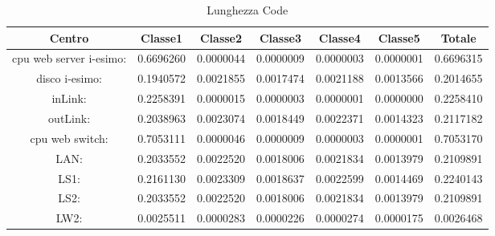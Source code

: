 \begin{table}[H]
\begin{center}\begin{scriptsize}
\begin{tabular}{||c|c|c|c|c|c|c||}
\hline
Centro &Classe1 &Classe2 &Classe3 &Classe4 &Classe5 &Totale\\
\hline
\hline
 cpu web server i-esimo: 	&0.6696260	&0.0000044	&0.0000009	&0.0000003	&0.0000001	&0.6696315	\\\hline
 disco i-esimo: 	&0.1940572	&0.0021855	&0.0017474	&0.0021188	&0.0013566	&0.2014655	\\\hline
 inLink: 	&0.2258391	&0.0000015	&0.0000003	&0.0000001	&0.0000000	&0.2258410	\\\hline
 outLink: 	&0.2038963	&0.0023074	&0.0018449	&0.0022371	&0.0014323	&0.2117182	\\\hline
 cpu web switch: 	&0.7053111	&0.0000046	&0.0000009	&0.0000003	&0.0000001	&0.7053170	\\\hline
 LAN: 	&0.2033552	&0.0022520	&0.0018006	&0.0021834	&0.0013979	&0.2109891	\\\hline
 LS1: 	&0.2161130	&0.0023309	&0.0018637	&0.0022599	&0.0014469	&0.2240143	\\\hline
 LS2: 	&0.2033552	&0.0022520	&0.0018006	&0.0021834	&0.0013979	&0.2109891	\\\hline
 LW2: 	&0.0025511	&0.0000283	&0.0000226	&0.0000274	&0.0000175	&0.0026468	\\\hline
\end{tabular}
\end{scriptsize}\end{center}
\caption{Lunghezza Code}
\label{lunghezzacode}
\end{table}

